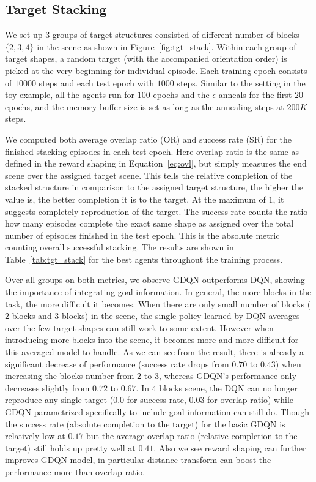 \subsection{Target Stacking}
We set up $3$ groups of target structures consisted of different number of blocks $\{2,3,4\}$ in the scene as shown in Figure~\ref{fig:tgt_stack}. Within each group of target shapes, a random target (with the accompanied orientation order) is picked at the very beginning for individual episode. Each training epoch consists of $10000$ steps and each test epoch with $1000$ steps. Similar to the setting in the toy example, all the agents run for $100$ epochs and the $\epsilon$ anneals for the first $20$ epochs, and the memory buffer size is set as long as the annealing steps at $200K$ steps. 

We computed both average overlap ratio (OR) and success rate (SR) for the finished stacking episodes in each test epoch. Here overlap ratio is the same as defined in the reward shaping in Equation~\ref{eq:ovl}, but simply measures the end scene over the assigned target scene. This tells the relative completion of the stacked structure in comparison to the assigned target structure, the higher the value is, the better completion it is to the target. At the maximum of $1$, it suggests completely reproduction of the target. The success rate counts the ratio how many episodes complete the exact same shape as assigned over the total number of episodes finished in the test epoch. This is the absolute metric counting overall successful stacking. The results are shown in Table~\ref{tab:tgt_stack} for the best agents throughout the training process.

Over all groups on both metrics, we observe GDQN outperforms DQN, showing the importance of integrating goal information. In general, the more blocks in the task, the more difficult it becomes. When there are only small number of blocks ($2$ blocks and $3$ blocks) in the scene, the single policy learned by DQN averages over the few target shapes can still work to some extent. However when introducing more blocks into the scene, it becomes more and more difficult for this averaged model to handle. As we can see from the result, there is already a significant decrease of performance (success rate drops from $0.70$ to $0.43$) when increasing the blocks number from $2$ to $3$, whereas GDQN's performance only decreases slightly from $0.72$ to $0.67$. In $4$ blocks scene, the DQN can no longer reproduce any single target ($0.0$ for success rate, $0.03$ for overlap ratio) while GDQN parametrized specifically to include goal information can still do. Though the success rate (absolute completion to the target) for the basic GDQN is relatively low at $0.17$ but the average overlap ratio (relative completion to the target) still holds up pretty well at $0.41$. Also we see reward shaping can further improves GDQN model, in particular distance transform can boost the performance more than overlap ratio.

